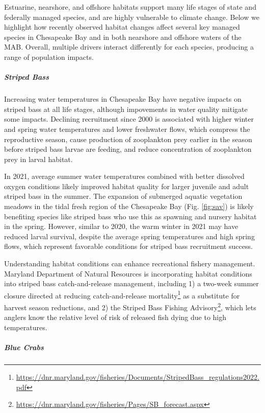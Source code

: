 \documentclass[
  10pt,
]{article}
\begin{document}
Estuarine, nearshore, and offshore habitats support many life stages of
state and federally managed species, and are highly vulnerable to
climate change. Below we highlight how recently observed habitat changes
affect several key managed species in Chesapeake Bay and in both
nearshore and offshore waters of the MAB. Overall, multiple drivers
interact differently for each species, producing a range of population
impacts.

\hypertarget{striped-bass}{%
\subparagraph{\texorpdfstring{\emph{Striped
Bass}}{Striped Bass}}\label{striped-bass}}

Increasing water temperatures in Chesapeake Bay have negative impacts on
striped bass at all life stages, although impovements in water quality
mitigate some impacts. Declining recruitment since 2000 is associated
with higher winter and spring water temperatures and lower freshwater
flows, which compress the reproductive season, cause production of
zooplankton prey earlier in the season before striped bass larvae are
feeding, and reduce concentration of zooplankton prey in larval habitat.

In 2021, average summer water temperatures combined with better
dissolved oxygen conditions likely improved habitat quality for larger
juvenile and adult striped bass in the summer. The expansion of
submerged aquatic vegetation meadows in the tidal fresh region of the
Chesapeake Bay (Fig. \ref{fig:sav}) is likely benefiting species like
striped bass who use this as spawning and nursery habitat in the spring.
However, similar to 2020, the warm winter in 2021 may have reduced
larval survival, despite the average spring temperatures and high spring
flows, which represent favorable conditions for striped bass recruitment
success.

Understanding habitat conditions can enhance recreational fishery
management. Maryland Department of Natural Resources is incorporating
habitat conditions into striped bass catch-and-release management,
including 1) a two-week summer closure directed at reducing
catch-and-release mortality\footnote{\url{https://dnr.maryland.gov/fisheries/Documents/StripedBass_regulations2022.pdf}}
as a substitute for harvest season reductions, and 2) the Striped Bass
Fishing Advisory\footnote{\url{https://dnr.maryland.gov/fisheries/Pages/SB_forecast.aspx}},
which lets anglers know the relative level of risk of released fish
dying due to high temperatures.

\hypertarget{blue-crabs}{%
\subparagraph{\texorpdfstring{\emph{Blue
Crabs}}{Blue Crabs}}\label{blue-crabs}}
\end{document}
